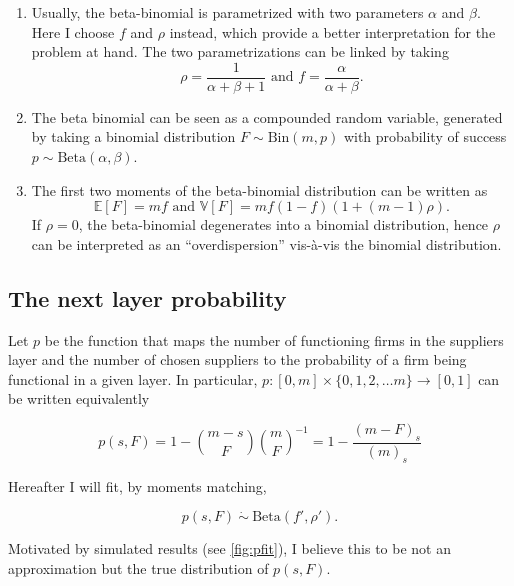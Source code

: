 \documentclass[american, abstract=on]{scrartcl}
\newcommand{\E}{\mathbb{E}}
\newcommand{\V}{\mathbb{V}}
\newcommand{\Beta}{\text{Beta}}
\newcommand{\Bin}{\text{Bin}}
\begin{document}
\begin{enumerate}
    \item Usually, the beta-binomial is parametrized with two parameters $\alpha$ and $\beta$. Here I choose $f$ and $\rho$ instead, which provide a better interpretation for the problem at hand. The two parametrizations can be linked by taking \begin{equation}
        \rho = \frac{1}{\alpha + \beta + 1} \text{ and } f = \frac{\alpha}{\alpha + \beta}.
    \end{equation}
    \item The beta binomial can be seen as a compounded random variable, generated by taking a binomial distribution $F \sim \Bin(m, p)$ with probability of success $p \sim \Beta(\alpha, \beta)$.
    \item The first two moments of the beta-binomial distribution can be written as \begin{equation}
        \E[F] = m f \text{ and } \V[F] = m f (1 - f) (1 + (m - 1) \rho).
    \end{equation} If $\rho = 0$, the beta-binomial degenerates into a binomial distribution, hence $\rho$ can be interpreted as an ``overdispersion'' vis-à-vis the binomial distribution.
\end{enumerate}

\subsection{The next layer probability}

Let $p$ be the function that maps the number of functioning firms in the suppliers layer and the number of chosen suppliers to the probability of a firm being functional in a given layer. In particular, $p: [0, m] \times \{0, 1, 2, \ldots m\} \to [0, 1]$ can be written equivalently

\begin{equation}
    p(s, F) = 1 - \binom{m - s}{F} \binom{m}{F}^{-1} = 1 - \frac{(m - F)_s}{(m)_s}
\end{equation}

Hereafter I will fit, by moments matching,

\begin{equation}
    p(s, F) \ \dot{\sim} \ \Beta(f', \rho').
\end{equation}

Motivated by simulated results (see \ref{fig:pfit}), I believe this to be not an approximation but the true distribution of $p(s, F)$. 
\end{document}
